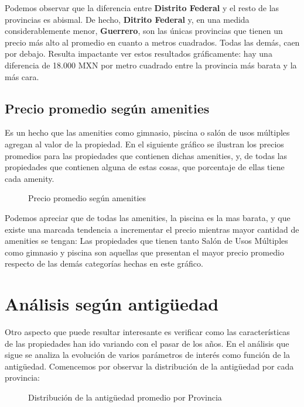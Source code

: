 \documentclass[
10pt, %
a4paper, %
oneside, %
headinclude,footinclude, %
BCOR5mm, %
]{scrartcl}
\begin{document}
    Podemos observar que la diferencia entre \textbf{Distrito Federal} y el resto de las provincias es abismal. De hecho, \textbf{Ditrito Federal} y, en una medida considerablemente menor, \textbf{Guerrero}, son las \'unicas provincias que tienen un precio m\'as alto al promedio en cuanto a metros cuadrados. Todas las dem\'as, caen por debajo. Resulta impactante ver estos resultados gr\'aficamente: hay una diferencia de 18.000 MXN por metro cuadrado entre la provincia m\'as barata y la m\'as cara.

    \newpage
    \subsection{Precio promedio según amenities}
    Es un hecho que las amenities como gimnasio, piscina o salón de usos múltiples agregan al valor de la propiedad. En el siguiente gráfico se ilustran los precios promedios para las propiedades que contienen dichas amenities, y, de todas las propiedades que contienen alguna de estas cosas, que porcentaje de ellas tiene cada amenity. 
    
    \begin{figure}[H]
        \caption{Precio promedio según amenities}
        \label{fig:precio-promedio-amenities}
    \end{figure}
    
    Podemos apreciar que de todas las amenities, la piscina es la mas barata, y que existe una marcada tendencia a incrementar el precio mientras mayor cantidad de amenities se tengan: Las propiedades que tienen tanto Salón de Usos Múltiples como gimnasio y piscina son aquellas que presentan el mayor precio promedio respecto de las demás categorías hechas en este gráfico.
 
\newpage
\section{Análisis según antigüedad}
    Otro aspecto que puede resultar interesante es verificar como las características de las propiedades han ido variando con el pasar de los años. En el análisis que sigue se analiza la evolución de varios parámetros de interés como función de la antigüedad.
    Comencemos por observar la distribución de la antigüedad por cada provincia:
    
        \begin{figure}[H]
        \caption{Distribución de la antigüedad promedio por Provincia}
        \label{fig:antiguedad-provincia}
    \end{figure}
    
\end{document}
